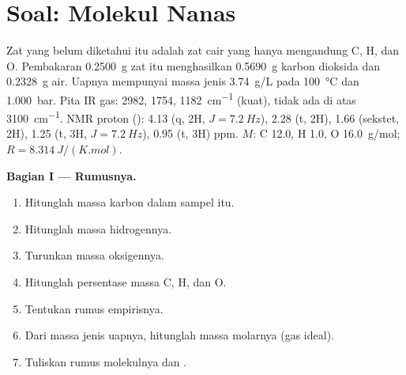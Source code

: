 \section{Soal: Molekul Nanas}

\begin{problem}
\label{pb:b1:structure-spectroscopy:1}
Zat yang belum diketahui itu adalah zat cair yang hanya mengandung C, H,
dan O. Pembakaran \qty{0.2500}{g} zat itu menghasilkan \qty{0.5690}{g}
karbon dioksida dan \qty{0.2328}{g} air. Uapnya mempunyai massa jenis
\qty{3.74}{g/L} pada \qty{100}{\celsius} dan \qty{1.000}{bar}. Pita IR
 gas: 2982, 1754, \qty{1182}{cm^{-1}} (kuat), tidak ada di atas
\qty{3100}{cm^{-1}}. NMR proton (): 4.13 (q, 2H, $J = \qty{7.2}{Hz}$),
2.28 (t, 2H), 1.66 (sekstet, 2H), 1.25 (t, 3H, $J = \qty{7.2}{Hz}$), 0.95
(t, 3H) ppm. $M$: C 12.0, H 1.0, O \qty{16.0}{g/mol}; $R =
\qty{8.314}{J/(K.mol)}$.

\begin{center}
\end{center}

\medskip
\noindent\textbf{Bagian I --- Rumusnya.}
\begin{enumerate}
  \item Hitunglah massa karbon dalam sampel itu.
  \item Hitunglah massa hidrogennya.
  \item Turunkan massa oksigennya.
  \item Hitunglah persentase massa C, H, dan O.
  \item Tentukan rumus empirisnya.
  \item Dari massa jenis uapnya, hitunglah massa molarnya (gas ideal).
  \item Tuliskan rumus molekulnya dan .
\end{enumerate}


\end{problem}
